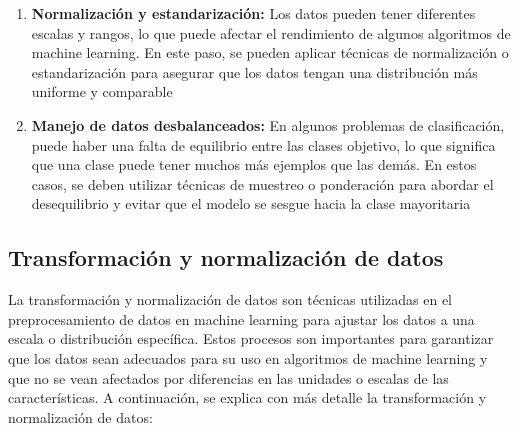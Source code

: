 \documentclass[../main.tex]{subfiles}
\begin{document}
\begin{enumerate}
            \item \textbf{Normalización y estandarización:} Los datos pueden tener diferentes escalas y rangos, lo que puede afectar el rendimiento de algunos algoritmos de machine learning. En este paso, se pueden aplicar técnicas de normalización o estandarización para asegurar que los datos tengan una distribución más uniforme y comparable
            \item \textbf{Manejo de datos desbalanceados:} En algunos problemas de clasificación, puede haber una falta de equilibrio entre las clases objetivo, lo que significa que una clase puede tener muchos más ejemplos que las demás. En estos casos, se deben utilizar técnicas de muestreo o ponderación para abordar el desequilibrio y evitar que el modelo se sesgue hacia la clase mayoritaria
        \end{enumerate}

    \subsection{Transformación y normalización de datos}
        La transformación y normalización de datos son técnicas utilizadas en el preprocesamiento de datos en machine learning para ajustar los datos a una escala o distribución específica. Estos procesos son importantes para garantizar que los datos sean adecuados para su uso en algoritmos de machine learning y que no se vean afectados por diferencias en las unidades o escalas de las características. A continuación, se explica con más detalle la transformación y normalización de datos:
	    
\end{document}
